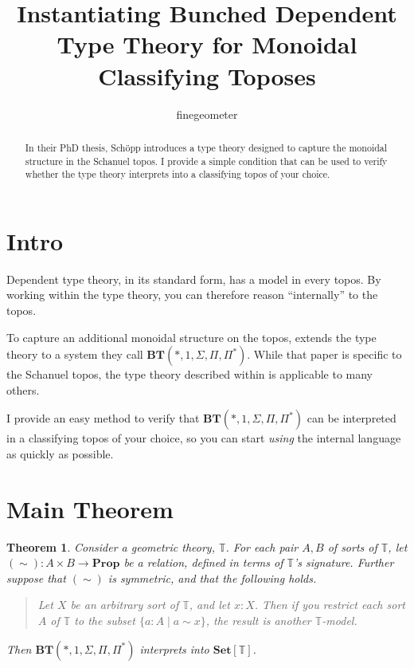 \documentclass{article}
\title{Instantiating Bunched Dependent Type Theory for Monoidal Classifying Toposes}
\author{finegeometer}
\newtheorem{theorem}{Theorem}[section]
\newcommand*{\Prop}{\mathbf{Prop}}
\newcommand*{\Set}{\mathbf{Set}}
\newcommand*{\T}{\mathbb{T}}
\begin{document}
\maketitle

\begin{abstract}
    In their PhD thesis, Sch\"opp introduces a type theory designed to capture the monoidal structure in the Schanuel topos.
    I provide a simple condition that can be used to verify whether the type theory interprets into a classifying topos of your choice.
\end{abstract}

\section{Intro}

Dependent type theory, in its standard form, has a model in every topos.
By working within the type theory, you can therefore reason ``internally'' to the topos.

To capture an additional monoidal structure on the topos,
\cite{schopp} extends the type theory to a system they call \(\mathbf{BT}(*, 1, \Sigma, \Pi, \Pi^*)\).
While that paper is specific to the Schanuel topos, the type theory described within is applicable to many others.

I provide an easy method to verify that \(\mathbf{BT}(*, 1, \Sigma, \Pi, \Pi^*)\)
can be interpreted in a classifying topos of your choice,
so you can start \emph{using} the internal language as quickly as possible.

\section{Main Theorem}

\begin{theorem}
    Consider a geometric theory, \(\T\).
    For each pair \(A,B\) of sorts of \(\T\), let \((\sim) : A \times B \to \Prop\) be a relation, defined in terms of \(\T\)'s signature.
    Further suppose that \((\sim)\) is symmetric, and that the following holds.

    \begin{quote}
        Let \(X\) be an arbitrary sort of \(\T\), and let \(x : X\).
        Then if you restrict each sort \(A\) of \(\T\) to the subset \(\{a : A \mid a \sim x\}\),
        the result is another \(\T\)-model.
    \end{quote}

    \noindent Then \(\mathbf{BT}(*, 1, \Sigma, \Pi, \Pi^*)\) interprets into \(\Set[\T]\).
\end{theorem}
\end{document}
